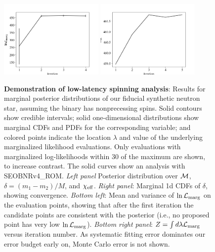 \documentclass[twocolumn,prd,nofootinbib]{revtex4}
\newcommand\editremark[1]{{\color{red} #1}}
\newcommand{\mc}{{\cal M}}
\begin{document}
\begin{figure}
\includegraphics[width=0.45\textwidth]{figures/bns_withspin_lnL_meanVar.png}
\includegraphics[width=0.45\textwidth]{figures/bns_withspin_lnL_converge.png}
\caption{\label{fig:BNS:Spin}\textbf{Demonstration of low-latency spinning analysis}:
Results for marginal posterior distributions
  of our fiducial synthetic neutron star, assuming the binary has nonprecessing spins.  Solid contours show credible intervals; solid one-dimensional distributions
  show marginal CDFs and PDFs for the corresponding variable; and colored points indicate the location $\lambda$ and
  value of the underlying marginalized likelihood evaluations.  Only evaluations with marginalized log-likelihoods within $30$ of the maximum are shown, to increase contrast. The solid curves show an analysis with SEOBNRv4\_ROM.
 \emph{Left panel } Posterior distribution
  over  $\mc$,
  $\delta=(m_1-m_2)/M$, and $\chi_{\rm eff}$.    \emph{Right panel}: Marginal 1d CDFs of $\delta$, showing convergence.
\emph{Bottom left}: Mean and variance of  $\ln{\cal L}_{\rm marg}$ on the evaluation points,  showing that after the
first iteration the
candidate points are consistent with the posterior (i.e., no proposed point has very low $\ln {\cal L}_{\rm marg}$).
\emph{Bottom right panel}: $Z = \int d\lambda {\cal L}_{\rm marg}$ versus iteration number.  As systematic fitting error dominates our
error budget early on, Monte Carlo error is not shown.
}
\end{figure}
\end{document}
